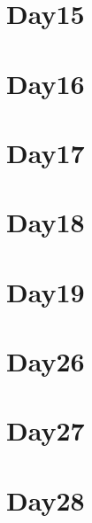 \section*{Day15}

\vfill
\section*{Day16}

\vfill
\section*{Day17}

\vfill
\section*{Day18}

\vfill
\section*{Day19}

\vfill
\section*{Day26}

\vfill
\section*{Day27}

\vfill
\section*{Day28}

\vfill

